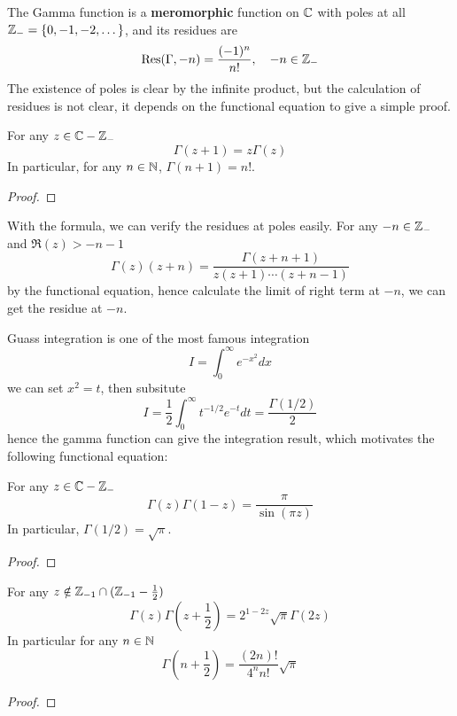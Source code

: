 \documentclass[12pt,a4paper]{article}
\begin{document}
The Gamma function is a \textbf{meromorphic} function on \(\mathbb{C}\) with poles at all \(\mathbb{Z}_{-} =\{0,-1,-2,\dots\} \), and its residues are
\[\mathrm{Res}(\Gamma,-n) = \frac{(-1)^n}{n!}, \quad -n \in \mathbb{Z}_{-}\]
The existence of poles is clear by the infinite product, but the calculation of residues is not clear, it depends on the functional equation to give a simple proof.

\begin{proposition}
    For any \(z \in \mathbb{C} - \mathbb{Z}_{-}\)
    \[\Gamma(z+1) = z\Gamma(z)\]
    In particular, for any \(n \in \mathbb{N}\), \(\Gamma(n+1) = n!\).
\end{proposition}

\begin{proof}
    
\end{proof}

\begin{remark}
    With the formula, we can verify the residues at poles easily. For any \(-n \in \mathbb{Z}_{-}\) and \(\Re(z) >-n-1\)
    \[\Gamma(z)(z+n) = \frac{\Gamma(z+n+1)}{z(z+1)\cdots(z+n-1)}\]
    by the functional equation, hence calculate the limit of right term at \(-n\), we can get the residue at \(-n\).
\end{remark}


Guass integration is one of the most famous integration 
\[I = \int_{0}^{\infty}e^{-x^2} dx \]
we can set \(x^2=t\), then subsitute 
\[I = \frac{1}{2} \int_{0}^{\infty} t^{-1/2}e^{-t} dt = \frac{\Gamma(1/2)}{2} \]
hence the gamma function can give the integration result, which motivates the following functional equation:
\begin{proposition}
    For any \(z \in \mathbb{C} - \mathbb{Z}_{-}\)
    \[\Gamma(z)\Gamma(1-z) = \frac{\pi}{\sin(\pi z)}\]
    In particular, \(\Gamma(1/2) = \sqrt{\pi}\).
\end{proposition}
\begin{proof}
    
\end{proof}
\begin{proposition}
    For any \(z \notin \mathbb{Z}_{-1}\cap(\mathbb{Z}_{-1}-\frac{1}{2})\)
    \[\Gamma(z)\Gamma(z+\frac{1}{2}) = 2^{1-2z}\sqrt{\pi}\Gamma(2z)\]
    In particular for any \(n \in \mathbb{N}\)
    \[\Gamma(n+\frac{1}{2}) = \frac{(2n)!}{4^n n!}\sqrt{\pi}\]
\end{proposition}
\begin{proof}
    
\end{proof}
\end{document}
